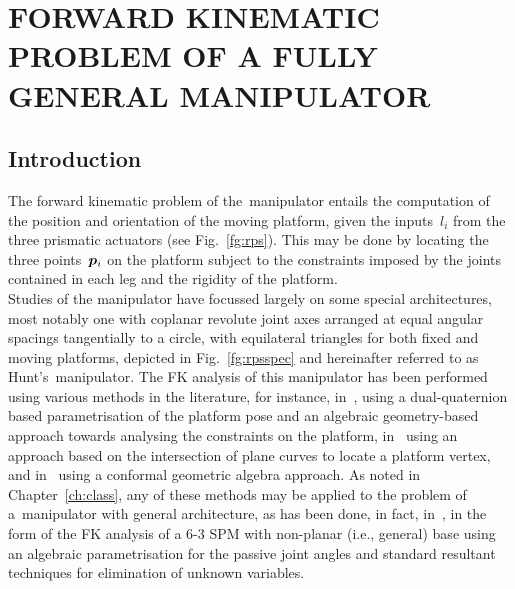 \documentclass[DD]{iitmdiss}
\newcommand{\mref}[1]{\ref{#1}}
\newcommand{\mcite}[1]{\cite{#1}}
\newcommand{\mlabel}[1]{\label{#1}}
\newcommand{\sg}[1]{\emph{\color{blue} [SG: #1]}}
\begin{document}
\chapter{FORWARD KINEMATIC PROBLEM OF A FULLY GENERAL \rps MANIPULATOR}\mlabel{ch:fkgen}
%
%
\section{Introduction} \mlabel{sc:fkgenintro} 
The forward kinematic problem of the~\rps manipulator entails the computation of the position and orientation of the moving platform, given the inputs~$l_i$ from the three prismatic actuators (see Fig.~\mref{fg:rps}). This may be done by locating the three points~$\bm{p}_i$ on the platform subject to the constraints imposed by the joints contained in each leg and the rigidity of the platform. \\
Studies of the manipulator have focussed largely on some special architectures, most notably one with coplanar revolute joint axes arranged at equal angular spacings tangentially to a circle, with equilateral triangles for both fixed and moving platforms, depicted in Fig.~\mref{fg:rpsspec} and hereinafter referred to as Hunt's~\rps manipulator. The FK analysis of this manipulator has been performed using various methods in the literature, for instance, in~\mcite{schadlbauer2014}, using a dual-quaternion based parametrisation of the platform pose and an algebraic geometry-based approach towards analysing the constraints on the platform, in~\mcite{tk2017a} using an approach based on the intersection of plane curves to locate a platform vertex, and in~\mcite{kong2018} using a conformal geometric algebra approach. As noted in Chapter~\mref{ch:class}, any of these methods may be applied to the problem of a~\rps manipulator with general architecture, as has been done, in fact, in~\mcite{innocenti1990}, in the form of the FK analysis of a 6-3 SPM with non-planar (i.e., general) base using an algebraic parametrisation for the passive joint angles and standard resultant techniques for elimination of unknown variables. \\
\end{document}
